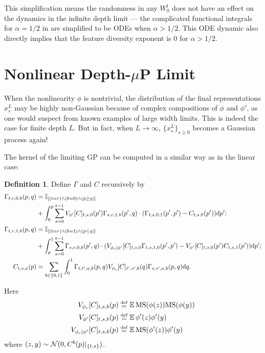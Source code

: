 \documentclass{article}
\theoremstyle{plain}
\theoremstyle{definition}
\newtheorem{definition}[theorem]{Definition}
\begin{document}
This simplification means the randomness in any $W_0^l$ does not have an effect on the dynamics in the infinite depth limit --- the complicated functional integrals for $\alpha=1/2$ in  are simplified to be ODEs when $\alpha >1/2$. This ODE dynamic also directly implies that the feature diversity exponent is 0 for $\alpha > 1/2$.


\section{Nonlinear Depth-$\mu$P Limit}

When the nonlinearity $\phi$ is nontrivial, the distribution of the final representations $x^L_s$ may be highly non-Gaussian because of complex compositions of $\phi$ and $\phi'$, as one would suspect from known examples of large width limits.
This is indeed the case for finite depth $L$. But in fact, when $L \to \infty$, $\{x^L_s\}_{s\ge 0}$ becomes a Gaussian process again!

The kernel of the limiting GP can be computed in a similar way as in the linear case:
\begin{definition}\label{defn:nonlinearGammaC}
    Define $\Gamma$ and $C$ recursively by
    \begin{align*}
        \Gamma_{t,r,0,b}(p, q)&=\mathbb{I}_{[(t=r) \wedge (b=0) \wedge (p\geq q)]} \\ 
        &+ \int_0^p \sum_{s=0}^{t-1} V_{\phi'}[C]_{t,s,0}(p')\Gamma_{s,r,1,b}(p',q)\cdot (\Gamma_{t,s,0,1}(p', p') - C_{t,s,0}(p'))\mathrm{d} p'; \\
           \Gamma_{t,r,1,b}(p, q) &= \mathbb{I}_{[(t=r) \wedge (b=1) \wedge (p\leq q)]} \\
           &+ \int_p^1 \sum_{s=0}^{t-1} \Gamma_{s,r,0,b}(p',q) \cdot (V_{\phi_c|\phi'}[C]_{t,s,0}\Gamma_{t,s,1,0}(p',p') - V_{\phi'}[C]_{t,s,0}(p') C_{t,s,1}(p'))\mathrm{d} p';\\
           C_{t,s,a}(p)&=
           \sum_{b\in\{0,1\}}\int_0^1 \Gamma_{t,t',a,b}(p,q) V_{\phi_c} [C]_{t',s',b}(q)\Gamma_{s,s',a,b}(p,q) \mathrm{d} q.
    \end{align*}
\end{definition}

Here
\begin{align*}
    V_{\phi_c}[C]_{t,s,b}(p) &\defeq \EV \MS(\phi(z)) \MS(\phi(y)) \\ 
    V_{\phi'}[C]_{t,s,b}(p) &\defeq \EV \phi'(z) \phi'(y) \\
    V_{\phi_c | \phi'}[C]_{t,s,b}(p) &\defeq \EV \MS(\phi'(z)) \phi'(y) \\
\end{align*}
where $(z, y) \sim \mathcal{N}(0, C^b(p)|_{\{t,s\}})$.
\end{document}
